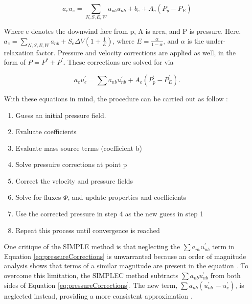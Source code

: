 \documentclass{UCF_ETD}
\begin{document}
\begin{equation}
    a_eu_e=\sum_{N,S,E,W}{a_{nb}u_{nb}+b_e+A_e\left(P_p-P_E\right)}
    \label{eq:pressureVelocityCoupling}
\end{equation}

Where e denotes the downwind face from p, A is area, and P is pressure. Here, \\ $a_e=\sum_{N,S,E,W}{a_{nb}+S_e\Delta V}\left(1+\frac{1}{E}\right)$, where $E=\frac{\alpha}{1-\alpha}$, and $\alpha$ is the under-relaxation factor. Pressure and velocity corrections are applied as well, in the form of $P=P^\ast+P^\prime$. These corrections are solved for via 

\begin{equation}
    a_eu_e^\prime=\sum{a_{nb}u_{nb}^\prime}+A_e\left(P_p^\prime-P_E^\prime\right).
    \label{eq:pressureCorrections}
\end{equation} 

With these equations in mind, the procedure can be carried out as follow \cite{Patankar1972ACP}:

\begin{enumerate}
    \item Guess an initial pressure field.
    \item Evaluate coefficients
    \item Evaluate mass source terms (coefficient b)
    \item Solve pressuire corrections at point p
    \item Correct the velocity and pressure fields
    \item Solve for fluxes $\Phi$, and update properties and coefficients
    \item Use the corrected pressure in step 4 as the new guess in step 1
    \item Repeat this process until convergence is reached
\end{enumerate}

One critique of the SIMPLE method is that neglecting the $\sum{a_{nb}u_{nb}^\prime}$ term in Equation \ref{eq:pressureCorrections} is unwarranted because an order of magnitude analysis shows that terms of a similar magnitude are present in the equation \cite{SIMPLEC}. To overcome this limitation, the SIMPLEC method subtracts $\sum{a_{nb}u_{nb}^\prime}$ from both sides of Equation \ref{eq:pressureCorrections}. The new term, $\sum{a_{nb}\left(u_{nb\ }^\prime-u_e^\prime\right)}$, is neglected instead, providing a more consistent approximation \cite{SIMPLEC}. 
\end{document}
